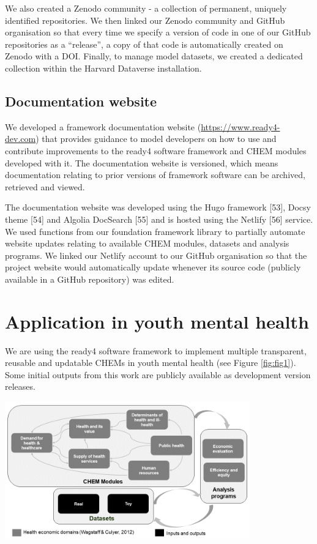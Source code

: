 \documentclass[
]{article}
\let\origfigure\figure
\let\endorigfigure\endfigure
\renewenvironment{figure}[1][2] {
    \expandafter\origfigure\expandafter[H]
} {
    \endorigfigure
}
\begin{document}
We also created a Zenodo community - a collection of permanent, uniquely identified repositories. We then linked our Zenodo community and GitHub organisation so that every time we specify a version of code in one of our GitHub repositories as a ``release'', a copy of that code is automatically created on Zenodo with a DOI. Finally, to manage model datasets, we created a dedicated collection within the Harvard Dataverse installation.

\hypertarget{documentation-website}{%
\subsection{Documentation website}\label{documentation-website}}

We developed a framework documentation website (\url{https://www.ready4-dev.com}) that provides guidance to model developers on how to use and contribute improvements to the ready4 software framework and CHEM modules developed with it. The documentation website is versioned, which means documentation relating to prior versions of framework software can be archived, retrieved and viewed.

The documentation website was developed using the Hugo framework {[}53{]}, Docsy theme {[}54{]} and Algolia DocSearch {[}55{]} and is hosted using the Netlify {[}56{]} service. We used functions from our foundation framework library to partially automate website updates relating to available CHEM modules, datasets and analysis programs. We linked our Netlify account to our GitHub organisation so that the project website would automatically update whenever its source code (publicly available in a GitHub repository) was edited.

\hypertarget{application-in-youth-mental-health}{%
\section{Application in youth mental health}\label{application-in-youth-mental-health}}

We are using the ready4 software framework to implement multiple transparent, reusable and updatable CHEMs in youth mental health (see Figure \ref{fig:fig1}). Some initial outputs from this work are publicly available as development version releases.

\begin{figure}
\includegraphics[width=400px]{Figure1} \caption{High level summary of planned implementation of youth mental health economic model}\label{fig:fig1}
\end{figure}
\end{document}
